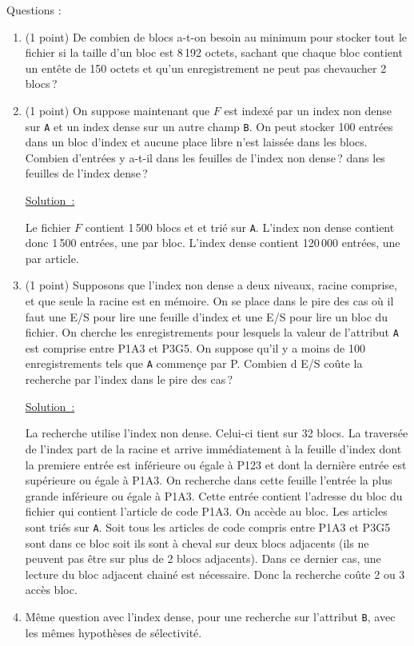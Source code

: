 \documentclass[french]{article}
\newenvironment{solution}{\nopagebreak\par\vspace*{2mm}\underline{Solution~:}\em\par}{\par\vspace*{2mm}}
\begin{document}
Questions :
\begin{enumerate}
  \item (1 point) De combien de blocs a-t-on besoin au minimum pour
           stocker tout
      le fichier si la taille d'un bloc est 8\,192 octets, sachant
          que chaque bloc contient un entête de 150 octets
          et qu'un enregistrement ne peut pas chevaucher 2 blocs\,?



  \item (1 point) 
    On suppose maintenant que $F$ est indexé par un index non dense 
    sur \texttt{A} et
     un index dense sur un autre champ \texttt{B}. On peut
   stocker 100 entrées dans un bloc d'index et
       aucune place libre n'est laissée dans les blocs. 
 Combien d'entrées y a-t-il dans les feuilles de l'index non dense\,? 
dans les feuilles de l'index dense\,? 
\begin{solution}
Le fichier $F$ contient 1\,500 blocs et et trié sur \texttt{A}.
 L'index non dense contient donc 1\,500
 entrées, une par bloc. L'index dense contient 120\,000 entrées, une par
article.
\end{solution}

  \item (1 point) Supposons que l'index non dense a deux niveaux, racine
     comprise, et que seule la racine est en mémoire.  On se place dans le pire
     des cas où il faut une E/S pour lire une feuille d'index et une E/S pour
     lire un bloc du fichier. On cherche les enregistrements pour lesquels la
     valeur de l'attribut \texttt{A} est comprise entre P1A3 et P3G5. On
     suppose qu'il y a moins de 100 enregistrements tels que \texttt{A}
     commençe par P. Combien d E/S coûte la recherche par l'index dans le pire
     des cas\,?

\begin{solution}
La recherche utilise  l'index non dense. Celui-ci tient sur 32 blocs.
La traversée de l'index part de la racine et arrive immédiatement à la
feuille d'index dont la premiere entrée est inférieure ou égale à P123 et dont
la dernière entrée est supérieure ou égale à P1A3. On recherche dans cette
feuille l'entrée la plus grande inférieure ou égale à P1A3. Cette entrée
contient l'adresse du bloc du fichier qui contient l'article de code  P1A3. 
On accède au bloc. Les articles sont triés sur \texttt{A}. Soit tous les
articles de code compris entre P1A3 et P3G5 sont dans ce bloc soit ils sont
à cheval sur deux blocs adjacents (ils ne peuvent pas être sur plus de 2 blocs
adjacents). Dans ce dernier cas, une lecture du bloc
adjacent chainé est nécessaire. Donc la recherche coûte 2 ou 3 accès
bloc.
\end{solution}

 \item Même question avec l'index dense, pour une recherche sur l'attribut
        \texttt{B}, avec les mêmes hypothèses de sélectivité.
\end{enumerate}
\end{document}

